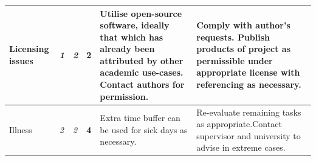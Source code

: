 \documentclass[12pt]{article}
\begin{document}
\begin{table}[h!]
\begin{tabular}{|>{\centering}m{1.5in} |>{\centering}m{0.1in} |>{\centering}m{0.1in} |>{\centering}m{0.3in} |>{\centering}m{1.8in} |>{\centering\arraybackslash}m{1.8in}|}
			Licensing issues                                                 & \cellcolor[HTML]{ABCB00}\textit{1} & \cellcolor[HTML]{F8FF00}\textit{2} & \cellcolor[HTML]{F8FF00}\textbf{2} & Utilise open-source software, ideally that which has already been attributed by other academic use-cases. Contact authors for permission.                         & Comply with author's requests. Publish products of project as permissible under appropriate license with referencing as necessary.                                                   \\ \hline
			Illness                                                          & \cellcolor[HTML]{F8FF00}\textit{2} & \cellcolor[HTML]{F8FF00}\textit{2} & \cellcolor[HTML]{F8FF00}\textbf{4} & Extra time buffer can be used for sick days as necessary.                                                                                                         & Re-evaluate remaining tasks as appropriate.Contact supervisor and university to advise in extreme cases.                                                                             \\ \hline
		\end{tabular}
	\end{table}
	
\end{document}
